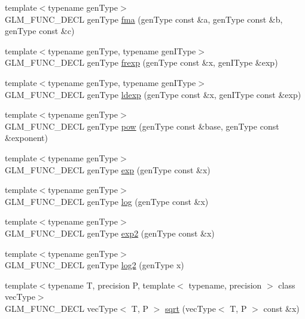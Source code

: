 \begin{CompactItemize}
\item 
{\footnotesize template$<$typename genType$>$ }\\GLM\_\-FUNC\_\-DECL genType \hyperlink{group__core__func__common_ga9d229fca69599e027dd6a097938367b}{fma} (genType const \&a, genType const \&b, genType const \&c)
\item 
{\footnotesize template$<$typename genType, typename genIType$>$ }\\GLM\_\-FUNC\_\-DECL genType \hyperlink{group__core__func__common_g70c119cca554aacd36008191e2c4b2bb}{frexp} (genType const \&x, genIType \&exp)
\item 
{\footnotesize template$<$typename genType, typename genIType$>$ }\\GLM\_\-FUNC\_\-DECL genType \hyperlink{group__core__func__common_g4b829eccd70b08b1a349e42ae3d4f4f7}{ldexp} (genType const \&x, genIType const \&exp)
\item 
{\footnotesize template$<$typename genType$>$ }\\GLM\_\-FUNC\_\-DECL genType \hyperlink{group__core__func__exponential_gfdaffc3606f4ee7f415cd64ada108356}{pow} (genType const \&base, genType const \&exponent)
\item 
{\footnotesize template$<$typename genType$>$ }\\GLM\_\-FUNC\_\-DECL genType \hyperlink{group__core__func__exponential_g0e7e69c5497cbbfe4afe08ee5449c553}{exp} (genType const \&x)
\item 
{\footnotesize template$<$typename genType$>$ }\\GLM\_\-FUNC\_\-DECL genType \hyperlink{group__core__func__exponential_gce8148db3949f9260f6f883f8dbae808}{log} (genType const \&x)
\item 
{\footnotesize template$<$typename genType$>$ }\\GLM\_\-FUNC\_\-DECL genType \hyperlink{group__core__func__exponential_g85f6efedaa47799e8f406481baca2171}{exp2} (genType const \&x)
\item 
{\footnotesize template$<$typename genType$>$ }\\GLM\_\-FUNC\_\-DECL genType \hyperlink{group__core__func__exponential_g501534b7328bab23128aa15b316e483d}{log2} (genType x)
\item 
{\footnotesize template$<$typename T, precision P, template$<$ typename, precision $>$ class vecType$>$ }\\GLM\_\-FUNC\_\-DECL vecType$<$ T, P $>$ \hyperlink{group__core__func__exponential_gfe49b7b63045b6ab94bffbcd7e7a7bc8}{sqrt} (vecType$<$ T, P $>$ const \&x)

\end{CompactItemize}
